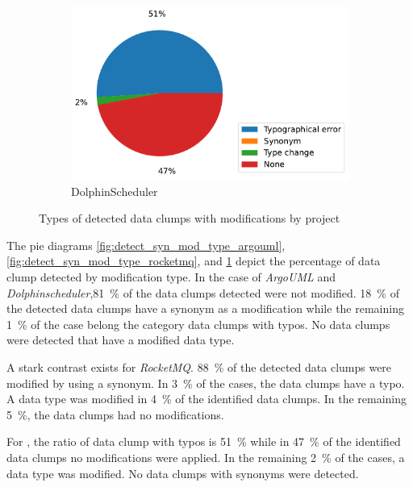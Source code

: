 \begin{figure}[ht!]
        \begin{subfigure}[t]{0.5\columnwidth}
        \includegraphics[width=1.2\columnwidth]{figures/chapter5/detectSyn_mod_type_dolphin.pdf}
        \caption{DolphinScheduler}
        \label{fig:detect_syn_mod_type_dolphinscheduler}
    \end{subfigure}

    \caption{Types of detected data clumps with modifications by project}
    
    \label{fig:detect_syn_mod_type}
\end{figure}
 The pie diagrams  \ref{fig:detect_syn_mod_type_argouml}, \ref{fig:detect_syn_mod_type_rocketmq}, and \ref{fig:detect_syn_mod_type_dolphinscheduler} depict the percentage of data clump detected by modification type. In the case of \textit{ArgoUML} and \textit{Dolphinscheduler},81~\% of the  data clumps detected were not modified. 18~\% of the detected data clumps have a synonym as a modification while the remaining 1~\% of the case belong the category data clumps with typos. No data clumps were detected that have a modified data type. 

 A stark contrast exists for \textit{RocketMQ}. 88~\% of the detected data clumps were modified by using a synonym. In 3~\% of the cases, the data clumps have a typo. A data type was modified in 4~\% of the identified data clumps. In the remaining 5~\%, the data clumps had no modifications. 

For \dolphinscheduler, the ratio of data clump with typos is 51~\% while in 47~\% of the identified data clumps no modifications were applied. In the remaining 2~\% of the cases, a data type was modified. No data clumps with synonyms were detected. 



